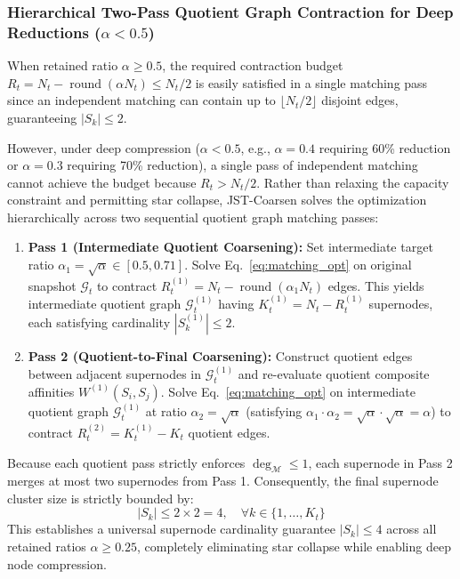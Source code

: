 \documentclass[sigconf]{acmart}
\begin{document}
\subsubsection{Hierarchical Two-Pass Quotient Graph Contraction for Deep Reductions ($\alpha < 0.5$)}
When retained ratio $\alpha \ge 0.5$, the required contraction budget $R_t = N_t - \operatorname{round}(\alpha N_t) \le N_t / 2$ is easily satisfied in a single matching pass since an independent matching can contain up to $\lfloor N_t / 2 \rfloor$ disjoint edges, guaranteeing $|S_k| \le 2$.

However, under deep compression ($\alpha < 0.5$, e.g., $\alpha = 0.4$ requiring 60\% reduction or $\alpha = 0.3$ requiring 70\% reduction), a single pass of independent matching cannot achieve the budget because $R_t > N_t / 2$. Rather than relaxing the capacity constraint and permitting star collapse, JST-Coarsen solves the optimization hierarchically across two sequential quotient graph matching passes:
\begin{enumerate}
    \item \textbf{Pass 1 (Intermediate Quotient Coarsening):} Set intermediate target ratio $\alpha_1 = \sqrt{\alpha} \in [0.5, 0.71]$. Solve Eq.~\eqref{eq:matching_opt} on original snapshot $\mathcal{G}_t$ to contract $R_t^{(1)} = N_t - \operatorname{round}(\alpha_1 N_t)$ edges. This yields intermediate quotient graph $\mathcal{G}_t^{(1)}$ having $K_t^{(1)} = N_t - R_t^{(1)}$ supernodes, each satisfying cardinality $|S_k^{(1)}| \le 2$.
    \item \textbf{Pass 2 (Quotient-to-Final Coarsening):} Construct quotient edges between adjacent supernodes in $\mathcal{G}_t^{(1)}$ and re-evaluate quotient composite affinities $W^{(1)}(S_i, S_j)$. Solve Eq.~\eqref{eq:matching_opt} on intermediate quotient graph $\mathcal{G}_t^{(1)}$ at ratio $\alpha_2 = \sqrt{\alpha}$ (satisfying $\alpha_1 \cdot \alpha_2 = \sqrt{\alpha} \cdot \sqrt{\alpha} = \alpha$) to contract $R_t^{(2)} = K_t^{(1)} - K_t$ quotient edges.
\end{enumerate}
Because each quotient pass strictly enforces $\operatorname{deg}_{\mathcal{M}} \le 1$, each supernode in Pass 2 merges at most two supernodes from Pass 1. Consequently, the final supernode cluster size is strictly bounded by:
\begin{equation}
\label{eq:supernode_cardinality_bound}
|S_k| \le 2 \times 2 = 4, \quad \forall k \in \{1, \dots, K_t\}
\end{equation}
This establishes a universal supernode cardinality guarantee $|S_k| \le 4$ across all retained ratios $\alpha \ge 0.25$, completely eliminating star collapse while enabling deep node compression.
\end{document}
